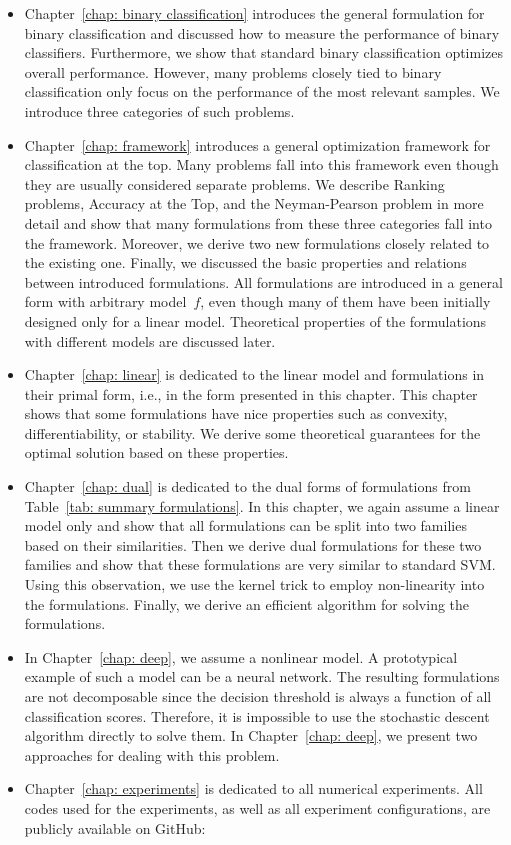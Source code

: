 \begin{itemize}
  \item Chapter~\ref{chap: binary classification} introduces the general formulation for binary classification and discussed how to measure the performance of binary classifiers. Furthermore, we show that standard binary classification optimizes overall performance. However, many problems closely tied to binary classification only focus on the performance of the most relevant samples. We introduce three categories of such problems.
  \item Chapter~\ref{chap: framework} introduces a general optimization framework for classification at the top. Many problems fall into this framework even though they are usually considered separate problems. We describe Ranking problems, Accuracy at the Top, and the Neyman-Pearson problem in more detail and show that many formulations from these three categories fall into the framework. Moreover, we derive two new formulations closely related to the existing one. Finally, we discussed the basic properties and relations between introduced formulations. All formulations are introduced in a general form with arbitrary model~$f$, even though many of them have been initially designed only for a linear model. Theoretical properties of the formulations with different models are discussed later.
  \item Chapter~\ref{chap: linear} is dedicated to the linear model and formulations in their primal form, i.e., in the form presented in this chapter. This chapter shows that some formulations have nice properties such as convexity, differentiability, or stability. We derive some theoretical guarantees for the optimal solution based on these properties.
  \item Chapter~\ref{chap: dual} is dedicated to the dual forms of formulations from Table~\ref{tab: summary formulations}. In this chapter, we again assume a linear model only and show that all formulations can be split into two families based on their similarities. Then we derive dual formulations for these two families and show that these formulations are very similar to standard SVM. Using this observation, we use the kernel trick to employ non-linearity into the formulations. Finally, we derive an efficient algorithm for solving the formulations.
  \item In Chapter~\ref{chap: deep}, we assume a nonlinear model. A prototypical example of such a model can be a neural network. The resulting formulations are not decomposable since the decision threshold is always a function of all classification scores. Therefore, it is impossible to use the stochastic descent algorithm directly to solve them. In Chapter~\ref{chap: deep}, we present two approaches for dealing with this problem.
  \item Chapter~\ref{chap: experiments} is dedicated to all numerical experiments. All codes used for the experiments, as well as all experiment configurations, are publicly available on GitHub: \github
\end{itemize}
